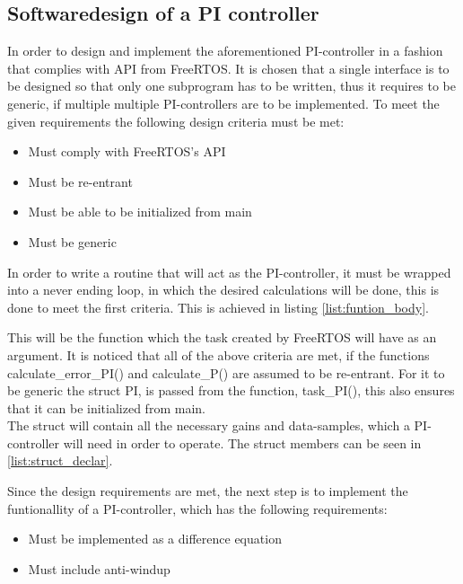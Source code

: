 \documentclass[../../../main]{subfiles}
\begin{document}
\subsection{Softwaredesign of a PI controller}
In order to design and implement the aforementioned PI-controller in a fashion that complies with API from FreeRTOS.
It is chosen that a single interface is to be designed so that only one subprogram has to be written, thus it requires to be generic, if multiple multiple PI-controllers are to be implemented.
To meet the given requirements the following design criteria must be met:

\begin{itemize}

  \item Must comply with FreeRTOS's API
  \item Must be re-entrant
  \item Must be able to be initialized from main
  \item Must be generic
\end{itemize}


In order to write a routine that will act as the PI-controller, it must be wrapped into a never ending loop, in which the desired calculations will be done, this is done to meet the first criteria.
This is achieved in listing \ref{list:funtion_body}.



This will be the function which the task created by FreeRTOS will have as an argument.
It is noticed that all of the above criteria are met, if the functions calculate\_error\_PI() and calculate\_P() are assumed to be re-entrant.
For it to be generic the struct PI, is passed from the function, task\_PI(), this also ensures that it can be initialized from main.
\\

The struct will contain all the necessary gains and data-samples, which a PI-controller will need in order to operate.
The struct members can be seen in \ref{list:struct_declar}.



Since the design requirements are met, the next step is to implement the funtionallity of a PI-controller, which has the following requirements:
\begin{itemize}
    \item Must be implemented as a difference equation
    \item Must include anti-windup
\end{itemize}
\end{document}
